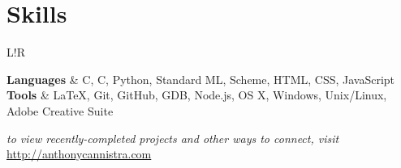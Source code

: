 \documentclass[10pt, letter]{article}
\newcommand\VRule{\color{lightgray}\vrule width 0.5pt}
\newcommand{\CC}{C\nolinebreak\hspace{-.05em}\raisebox{.4ex}{\tiny\bf +}\nolinebreak\hspace{-.10em}\raisebox{.4ex}{\tiny\bf +}}
\def\CC{{C\nolinebreak[4]\hspace{-.05em}\raisebox{.4ex}{\tiny\bf ++}}}
\begin{document}
    

   
\vspace{6pt}


\vspace{-15pt}
\section*{Skills}
\begin{tabular}{L!{\VRule}R}

\textbf{Languages} & C, \CC, Python, Standard ML, Scheme, HTML, CSS, JavaScript \vspace{6pt}  \\
\textbf{Tools} \vspace{6pt} & \LaTeX, Git, GitHub, GDB, Node.js, OS X, Windows, Unix/Linux, Adobe Creative Suite \\
\end{tabular}
\null
\vfill
\emph{to view recently-completed projects and other ways to connect, visit} \url{http://anthonycannistra.com}
\end{document}
